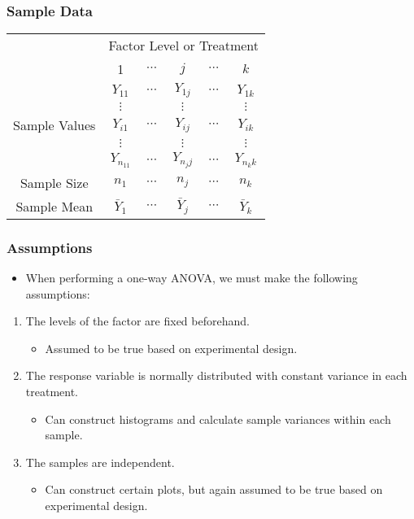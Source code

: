 \documentclass[12pt]{beamer}
\begin{document}
\begin{frame}
	\frametitle{Sample Data}
	
	\begin{center}
		\small
		\begin{tabular}{cccccc}
			\toprule
			& \multicolumn{5}{c}{Factor Level or Treatment} \\
			\cline{2-6}
			& 1 & $\cdots$ & $j$ & $\cdots$ & $k$ \\
			\midrule
			& $Y_{11}$ & $\cdots$ & $Y_{1j}$ & $\cdots$ & $Y_{1k}$ \\
			& $\vdots$ & & $\vdots$ & & $\vdots$ \\
			Sample Values & $Y_{i1}$ & $\cdots$ & $Y_{ij}$ & $\cdots$ & $Y_{ik}$ \\
			& $\vdots$ & & $\vdots$ & & $\vdots$ \\
			& $Y_{n_11}$ & $\cdots$ & $Y_{n_jj}$ & $\cdots$ & $Y_{n_kk}$ \\
			\hline
			Sample Size & $n_1$ & $\cdots$ & $n_j$ & $\cdots$ & $n_k$ \\
			\midrule
			Sample Mean & $\bar{Y}_1$ & $\cdots$ & $\bar{Y}_j$ & $\cdots$ & $\bar{Y}_k$ \\
			\bottomrule
		\end{tabular}
	\end{center}
	
\end{frame}
\begin{frame}
	\frametitle{Assumptions}
	
	\begin{itemize}[label={\color{blue}$\blacktriangleright$}]
		\item When performing a one-way ANOVA, we must make the following assumptions:
	\end{itemize}
	
	\begin{enumerate}[label=\arabic*.]
		\item The levels of the factor are fixed beforehand.
		\begin{itemize}[label={\color{blue}$\blacktriangleright$}]
			\item Assumed to be true based on experimental design.
		\end{itemize}
		
		\item The response variable is normally distributed with constant variance in each treatment.
		\begin{itemize}[label={\color{blue}$\blacktriangleright$}]
			\item Can construct histograms and calculate sample variances within each sample.
		\end{itemize}
		
		\item The samples are independent.
		\begin{itemize}[label={\color{blue}$\blacktriangleright$}]
			\item Can construct certain plots, but again assumed to be true based on experimental design.
		\end{itemize}
	\end{enumerate}
	
\end{frame}
\end{document}
